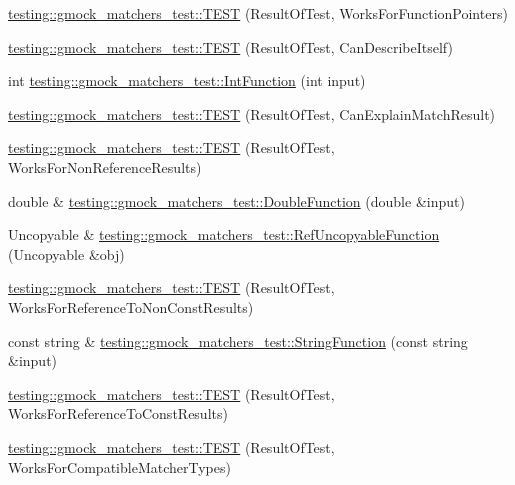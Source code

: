 \begin{DoxyCompactItemize}
\item 
\hyperlink{namespacetesting_1_1gmock__matchers__test_a5aea17c7d3dd74cbc0cbf181b3a9e5f8}{testing\+::gmock\+\_\+matchers\+\_\+test\+::\+T\+E\+ST} (Result\+Of\+Test, Works\+For\+Function\+Pointers)
\item 
\hyperlink{namespacetesting_1_1gmock__matchers__test_a1b5240d2272b679d7e3035554c2c5688}{testing\+::gmock\+\_\+matchers\+\_\+test\+::\+T\+E\+ST} (Result\+Of\+Test, Can\+Describe\+Itself)
\item 
int \hyperlink{namespacetesting_1_1gmock__matchers__test_a6e957b9dcda1186c6274a8895d1514b5}{testing\+::gmock\+\_\+matchers\+\_\+test\+::\+Int\+Function} (int input)
\item 
\hyperlink{namespacetesting_1_1gmock__matchers__test_ab7fe283b2955ca8bb11b2984a08eef33}{testing\+::gmock\+\_\+matchers\+\_\+test\+::\+T\+E\+ST} (Result\+Of\+Test, Can\+Explain\+Match\+Result)
\item 
\hyperlink{namespacetesting_1_1gmock__matchers__test_a86f01e29ee48050d401fceca21d1041e}{testing\+::gmock\+\_\+matchers\+\_\+test\+::\+T\+E\+ST} (Result\+Of\+Test, Works\+For\+Non\+Reference\+Results)
\item 
double \& \hyperlink{namespacetesting_1_1gmock__matchers__test_a48350ba4c1ce65694ec07e9c1c49a452}{testing\+::gmock\+\_\+matchers\+\_\+test\+::\+Double\+Function} (double \&input)
\item 
Uncopyable \& \hyperlink{namespacetesting_1_1gmock__matchers__test_aa6f7dd285163d5880cfd6685bec8cab4}{testing\+::gmock\+\_\+matchers\+\_\+test\+::\+Ref\+Uncopyable\+Function} (Uncopyable \&obj)
\item 
\hyperlink{namespacetesting_1_1gmock__matchers__test_a505e866c4066d27854cb6754c66a3eec}{testing\+::gmock\+\_\+matchers\+\_\+test\+::\+T\+E\+ST} (Result\+Of\+Test, Works\+For\+Reference\+To\+Non\+Const\+Results)
\item 
const string \& \hyperlink{namespacetesting_1_1gmock__matchers__test_a5fdf1ecaf8e8e8ef5d57c311e675841d}{testing\+::gmock\+\_\+matchers\+\_\+test\+::\+String\+Function} (const string \&input)
\item 
\hyperlink{namespacetesting_1_1gmock__matchers__test_a17b952cce22be6338fb1369f886d61c4}{testing\+::gmock\+\_\+matchers\+\_\+test\+::\+T\+E\+ST} (Result\+Of\+Test, Works\+For\+Reference\+To\+Const\+Results)
\item 
\hyperlink{namespacetesting_1_1gmock__matchers__test_a1aceb307c843f0f5532053e390a7c654}{testing\+::gmock\+\_\+matchers\+\_\+test\+::\+T\+E\+ST} (Result\+Of\+Test, Works\+For\+Compatible\+Matcher\+Types)

\end{DoxyCompactItemize}
